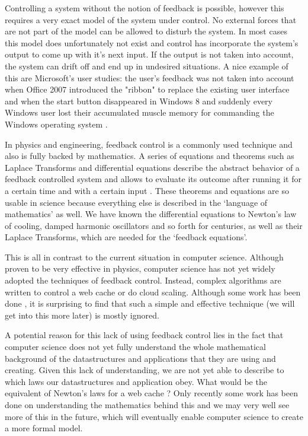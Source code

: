 Controlling a system without the notion of feedback is possible, however this requires a very exact model of the system under control. No external forces that are not part of the model can be allowed to disturb the system. In most cases this model does unfortunately not exist and control has incorporate the system's output to come up with it's next input. If the output is not taken into account, the system can drift off and end up in undesired situations. A nice example of this are Microsoft's user studies: the user's feedback was not taken into account when Office 2007 introduced the "ribbon" to replace the existing user interface and when the start button disappeared in Windows 8 and suddenly every Windows user lost their accumulated muscle memory for commanding the Windows operating system \cite{meijer2014-embracing-the-hacker-way}.

In physics and engineering, feedback control is a commonly used technique and also is fully backed by mathematics. A series of equations and theorems such as Laplace Transforms and differential equations describe the abstract behavior of a feedback controlled system and allows to evaluate its outcome after running it for a certain time and with a certain input \cite{hellerstein2004-feedback, janert2013-feedback}. These theorems and equations are so usable in science because everything else is described in the `language of mathematics' as well. We have known the differential equations to Newton's law of cooling, damped harmonic oscillators and so forth for centuries, as well as their Laplace Transforms, which are needed for the `feedback equations'.

This is all in contrast to the current situation in computer science. Although proven to be very effective in physics, computer science has not yet widely adopted the techniques of feedback control. Instead, complex algorithms are written to control a web cache or do cloud scaling. Although some work has been done , it is surprising to find that such a simple and effective technique (we will get into this more later) is mostly ignored.

A potential reason for this lack of using feedback control lies in the fact that computer science does not yet fully understand the whole mathematical background of the datastructures and applications that they are using and creating. Given this lack of understanding, we are not yet able to describe to which laws our datastructures and application obey. What would be the equivalent of Newton's laws for a web cache \cite{janert2013-feedback}? Only recently some work has been done on understanding the mathematics behind this \cite{beckmann2015-cache-calculus} and we may very well see more of this in the future, which will eventually enable computer science to create a more formal model.

